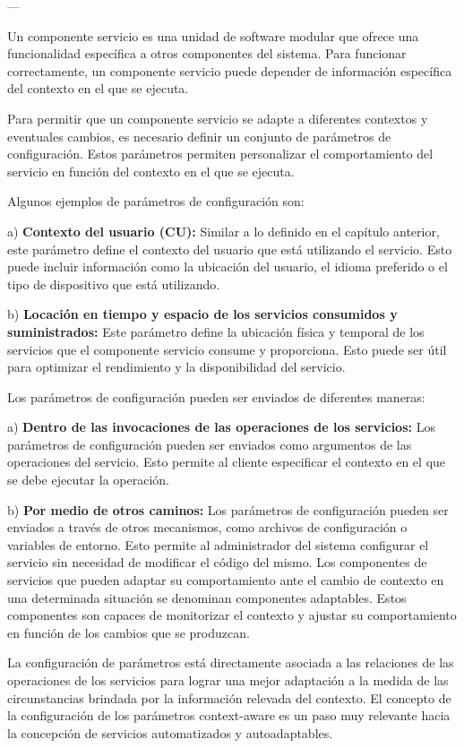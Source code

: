 \begin{itemize}
---

Un componente servicio es una unidad de software modular que ofrece una funcionalidad específica a otros componentes del sistema. Para funcionar correctamente, un componente servicio puede depender de información específica del contexto en el que se ejecuta.

Para permitir que un componente servicio se adapte a diferentes contextos y eventuales cambios, es necesario definir un conjunto de parámetros de configuración. Estos parámetros permiten personalizar el comportamiento del servicio en función del contexto en el que se ejecuta.

Algunos ejemplos de parámetros de configuración son:

a) \textbf{Contexto del usuario (CU):} Similar a lo definido en el capítulo anterior, este parámetro define el contexto del usuario que está utilizando el servicio. Esto puede incluir información como la ubicación del usuario, el idioma preferido o el tipo de dispositivo que está utilizando.

b) \textbf{Locación en tiempo y espacio de los servicios consumidos y suministrados:} Este parámetro define la ubicación física y temporal de los servicios que el componente servicio consume y proporciona. Esto puede ser útil para optimizar el rendimiento y la disponibilidad del servicio.


Los parámetros de configuración pueden ser enviados de diferentes maneras:

a) \textbf{Dentro de las invocaciones de las operaciones de los servicios:} Los parámetros de configuración pueden ser enviados como argumentos de las operaciones del servicio. Esto permite al cliente especificar el contexto en el que se debe ejecutar la operación.

b) \textbf{Por medio de otros caminos: }Los parámetros de configuración pueden ser enviados a través de otros mecanismos, como archivos de configuración o variables de entorno. Esto permite al administrador del sistema configurar el servicio sin necesidad de modificar el código del mismo.
Los componentes de servicios que pueden adaptar su comportamiento ante el cambio de contexto en una determinada situación se denominan componentes adaptables. Estos componentes son capaces de monitorizar el contexto y ajustar su comportamiento en función de los cambios que se produzcan.


La configuración de parámetros está directamente asociada a las relaciones de las operaciones de los servicios para lograr una mejor adaptación a la medida de las circunstancias brindada por la información relevada del contexto. El concepto de la configuración de los parámetros context-aware es un paso muy relevante hacia la concepción de servicios automatizados y autoadaptables. 


\end{itemize}
